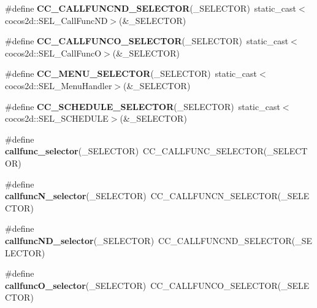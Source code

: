 \begin{DoxyCompactItemize}
\#define {\bfseries C\+C\+\_\+\+C\+A\+L\+L\+F\+U\+N\+C\+N\+D\+\_\+\+S\+E\+L\+E\+C\+T\+OR}(\+\_\+\+S\+E\+L\+E\+C\+T\+OR)~static\+\_\+cast$<$cocos2d\+::\+S\+E\+L\+\_\+\+Call\+Func\+ND$>$(\&\+\_\+\+S\+E\+L\+E\+C\+T\+OR)
\item 
\mbox{\label{group__base_gacc358701e9f3c5b6629930a999f97eb8}} 
\#define {\bfseries C\+C\+\_\+\+C\+A\+L\+L\+F\+U\+N\+C\+O\+\_\+\+S\+E\+L\+E\+C\+T\+OR}(\+\_\+\+S\+E\+L\+E\+C\+T\+OR)~static\+\_\+cast$<$cocos2d\+::\+S\+E\+L\+\_\+\+Call\+FuncO$>$(\&\+\_\+\+S\+E\+L\+E\+C\+T\+OR)
\item 
\mbox{\label{group__base_gaf2d69346f4d31ab77732198a9ebe0f22}} 
\#define {\bfseries C\+C\+\_\+\+M\+E\+N\+U\+\_\+\+S\+E\+L\+E\+C\+T\+OR}(\+\_\+\+S\+E\+L\+E\+C\+T\+OR)~static\+\_\+cast$<$cocos2d\+::\+S\+E\+L\+\_\+\+Menu\+Handler$>$(\&\+\_\+\+S\+E\+L\+E\+C\+T\+OR)
\item 
\mbox{\label{group__base_ga364ba06f4b51d54fe45605b4cde10302}} 
\#define {\bfseries C\+C\+\_\+\+S\+C\+H\+E\+D\+U\+L\+E\+\_\+\+S\+E\+L\+E\+C\+T\+OR}(\+\_\+\+S\+E\+L\+E\+C\+T\+OR)~static\+\_\+cast$<$cocos2d\+::\+S\+E\+L\+\_\+\+S\+C\+H\+E\+D\+U\+LE$>$(\&\+\_\+\+S\+E\+L\+E\+C\+T\+OR)
\item 
\mbox{\label{group__base_gadbfffb29c6db99730b3725d392b5c6ce}} 
\#define {\bfseries callfunc\+\_\+selector}(\+\_\+\+S\+E\+L\+E\+C\+T\+OR)~C\+C\+\_\+\+C\+A\+L\+L\+F\+U\+N\+C\+\_\+\+S\+E\+L\+E\+C\+T\+OR(\+\_\+\+S\+E\+L\+E\+C\+T\+OR)
\item 
\mbox{\label{group__base_gaae5d36086e660775212ac58171e5b9c1}} 
\#define {\bfseries callfunc\+N\+\_\+selector}(\+\_\+\+S\+E\+L\+E\+C\+T\+OR)~C\+C\+\_\+\+C\+A\+L\+L\+F\+U\+N\+C\+N\+\_\+\+S\+E\+L\+E\+C\+T\+OR(\+\_\+\+S\+E\+L\+E\+C\+T\+OR)
\item 
\mbox{\label{group__base_gaf6e1b4d4334a7aa7950a17f361aaff80}} 
\#define {\bfseries callfunc\+N\+D\+\_\+selector}(\+\_\+\+S\+E\+L\+E\+C\+T\+OR)~C\+C\+\_\+\+C\+A\+L\+L\+F\+U\+N\+C\+N\+D\+\_\+\+S\+E\+L\+E\+C\+T\+OR(\+\_\+\+S\+E\+L\+E\+C\+T\+OR)
\item 
\mbox{\label{group__base_ga7b930d3a73de79074daa4523fa18df73}} 
\#define {\bfseries callfunc\+O\+\_\+selector}(\+\_\+\+S\+E\+L\+E\+C\+T\+OR)~C\+C\+\_\+\+C\+A\+L\+L\+F\+U\+N\+C\+O\+\_\+\+S\+E\+L\+E\+C\+T\+OR(\+\_\+\+S\+E\+L\+E\+C\+T\+OR)

\end{DoxyCompactItemize}
